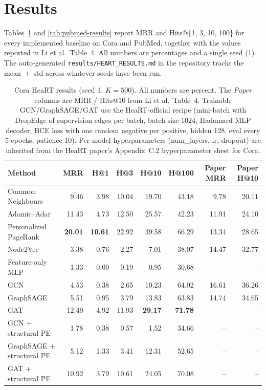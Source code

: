 \documentclass[10pt,a4paper]{article}
\begin{document}
\section{Results}
\label{sec:results}

Tables~\ref{tab:cora-results} and \ref{tab:pubmed-results} report MRR
and Hits@\{1, 3, 10, 100\} for every implemented baseline on Cora and
PubMed, together with the values reported in Li et al.\ Table~4. All
numbers are percentages and a single seed (1). The auto-generated
\texttt{results/HEART\_RESULTS.md} in the repository tracks the
mean~$\pm$~std across whatever seeds have been run.

\begin{table}[t]
\centering
\small
\caption{Cora HeaRT results (seed 1, $K=500$). All numbers are percent. The
\emph{Paper} columns are MRR / Hits@10 from Li et al.\ Table~4. Trainable
GCN/GraphSAGE/GAT use the HeaRT-official recipe (mini-batch with
DropEdge of supervision edges per batch, batch size $1024$, Hadamard
MLP decoder, BCE loss with one random negative per positive, hidden
$128$, eval every 5 epochs, patience 10). Per-model hyperparameters
(num\_layers, lr, dropout) are inherited from the HeaRT paper's
Appendix~C.2 hyperparameter sheet for Cora.}
\label{tab:cora-results}
\begin{tabular}{@{}lrrrrr@{\hskip 1.2em}rr@{}}
\toprule
\textbf{Method} & \textbf{MRR} & \textbf{H@1} & \textbf{H@3} & \textbf{H@10} & \textbf{H@100} & \textbf{Paper MRR} & \textbf{Paper H@10}\\
\midrule
Common Neighbours      &  9.46 &  3.98 & 10.04 & 19.70 & 43.18 &  9.78 & 20.11\\
Adamic--Adar           & 11.43 &  4.73 & 12.50 & 25.57 & 42.23 & 11.91 & 24.10\\
Personalized PageRank  & \textbf{20.01} & \textbf{10.61} & 22.92 & 39.58 & 66.29 & 13.34 & 28.65\\
Node2Vec               &  3.38 &  0.76 &  2.27 &  7.01 & 38.07 & 14.47 & 32.77\\
Feature-only MLP       &  1.33 &  0.00 &  0.19 &  0.95 & 30.68 & --   & --\\
GCN                    &  4.53 &  0.38 &  2.65 & 10.23 & 64.02 & 16.61 & 36.26\\
GraphSAGE              &  5.51 &  0.95 &  3.79 & 13.83 & 63.83 & 14.74 & 34.65\\
GAT                    & 12.49 &  4.92 & 11.93 & \textbf{29.17} & \textbf{71.78} & --   & --\\
GCN + structural PE    &  1.78 &  0.38 &  0.57 &  1.52 & 34.66 & --   & --\\
GraphSAGE + structural PE & 5.12 & 1.33 &  3.41 & 12.31 & 52.65 & --   & --\\
GAT + structural PE    & 10.92 &  3.79 & 10.61 & 24.05 & 70.08 & --   & --\\
\bottomrule
\end{tabular}
\end{table}
\end{document}
